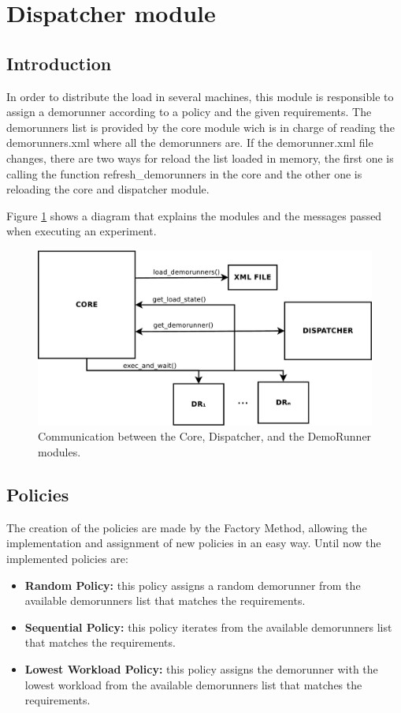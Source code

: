 \section{Dispatcher module}
\label{sec:Dispatcher}
\subsection{Introduction}
In order to distribute the load in several machines, this module is responsible to assign a demorunner according to a policy and the given requirements. 
The demorunners list is provided by the core module wich is in charge of reading the demorunners.xml where all the demorunners are. If the 
demorunner.xml file changes, there are two ways for reload the list loaded in memory, the first one is calling the function refresh\_demorunners
in the core and the other one is reloading the core and dispatcher module.

Figure \ref{fig:core_diagram} shows a diagram that explains the modules and the messages passed when executing an experiment. 
%
\begin{figure}[!ht]
\centering
\includegraphics[width=0.7\columnwidth]{dispatcher/images/core_dispatcher.pdf}
\caption{Communication between the Core, Dispatcher, and the DemoRunner modules.}
\label{fig:core_diagram}
\end{figure}

\subsection{Policies}
The creation of the policies are made by the Factory Method, allowing the implementation and assignment of new policies in an easy way.
Until now the implemented policies are:

\begin{itemize}
\item \textbf{Random Policy:} this policy assigns a random demorunner from the available demorunners list that matches the requirements.
\item \textbf{Sequential Policy:} this policy iterates from the available demorunners list that matches the requirements.
\item \textbf{Lowest Workload Policy:} this policy assigns the demorunner with the lowest workload from the available demorunners list that matches the requirements.
\end{itemize}


